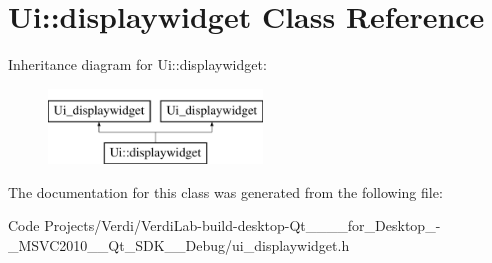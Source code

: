\hypertarget{class_ui_1_1displaywidget}{\section{\-Ui\-:\-:displaywidget \-Class \-Reference}
\label{class_ui_1_1displaywidget}
}
\-Inheritance diagram for \-Ui\-:\-:displaywidget\-:\begin{figure}[H]
\begin{center}
\leavevmode
\includegraphics[height=2.000000cm]{class_ui_1_1displaywidget}
\end{center}
\end{figure}


\-The documentation for this class was generated from the following file\-:\begin{DoxyCompactItemize}
\item 
\-Code Projects/\-Verdi/\-Verdi\-Lab-\/build-\/desktop-\/\-Qt\-\_\-\_\-\_\-\_\-for\-\_\-\-Desktop\-\_\--\/\-\_\-\-M\-S\-V\-C2010\-\_\-\-\_\-\-Qt\-\_\-\-S\-D\-K\-\_\-\-\_\-\-Debug/ui\-\_\-displaywidget.\-h\end{DoxyCompactItemize}
